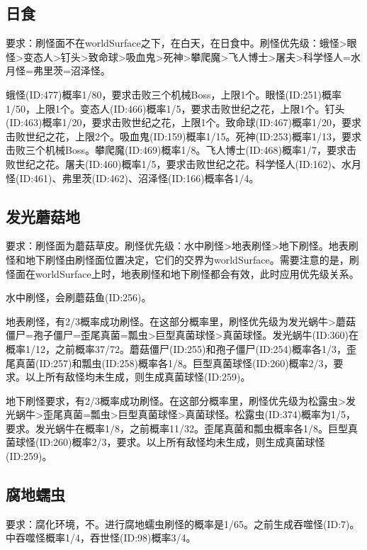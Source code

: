 \subsection{日食}
要求：刷怪面不在worldSurface之下，在白天，在日食中。刷怪优先级：蛾怪>眼怪>变态人>钉头>致命球>吸血鬼>死神>攀爬魔>飞人博士>屠夫>科学怪人=水月怪=弗里茨=沼泽怪。

蛾怪(ID:477)概率1/80，要求击败三个机械Boss，上限1个。眼怪(ID:251)概率1/50，上限1个。变态人(ID:466)概率1/5，要求击败世纪之花，上限1个。钉头(ID:463)概率1/20，要求击败世纪之花，上限1个。致命球(ID:467)概率1/20，要求击败世纪之花，上限2个。吸血鬼(ID:159)概率1/15。死神(ID:253)概率1/13，要求击败三个机械Boss。攀爬魔(ID:469)概率1/8。飞人博士(ID:468)概率1/7，要求击败世纪之花。屠夫(ID:460)概率1/5，要求击败世纪之花。科学怪人(ID:162)、水月怪(ID:461)、弗里茨(ID:462)、沼泽怪(ID:166)概率各1/4。

\subsection{发光蘑菇地}
要求：刷怪面为蘑菇草皮。刷怪优先级：水中刷怪>地表刷怪>地下刷怪。地表刷怪和地下刷怪由刷怪面位置决定，它们的交界为worldSurface。需要注意的是，刷怪面在worldSurface上时，地表刷怪和地下刷怪都会有效，此时应用优先级关系。

水中刷怪，会刷蘑菇鱼(ID:256)。

地表刷怪，有2/3概率成功刷怪。在这部分概率里，刷怪优先级为发光蜗牛>蘑菇僵尸=孢子僵尸=歪尾真菌=瓢虫>巨型真菌球怪>真菌球怪。发光蜗牛(ID:360)在概率1/12，之前概率37/72。蘑菇僵尸(ID:255)和孢子僵尸(ID:254)概率各1/3，歪尾真菌(ID:257)和瓢虫(ID:258)概率各1/8。巨型真菌球怪(ID:260)概率2/3，要求。以上所有敌怪均未生成，则生成真菌球怪(ID:259)。

地下刷怪要求，有2/3概率成功刷怪。在这部分概率里，刷怪优先级为松露虫>发光蜗牛>歪尾真菌=瓢虫>巨型真菌球怪>真菌球怪。松露虫(ID:374)概率为1/5，要求。发光蜗牛在概率1/8，之前概率11/32。歪尾真菌和瓢虫概率各1/8。巨型真菌球怪(ID:260)概率2/3，要求。以上所有敌怪均未生成，则生成真菌球怪(ID:259)。

\subsection{腐地蠕虫}
要求：腐化环境，不。进行腐地蠕虫刷怪的概率是1/65。之前生成吞噬怪(ID:7)。中吞噬怪概率1/4，吞世怪(ID:98)概率3/4。

